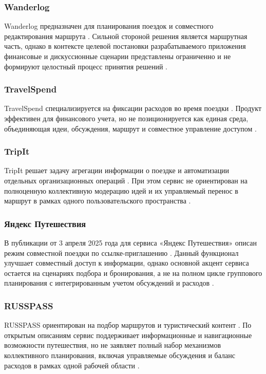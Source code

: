 \subsubsection{Wanderlog}
Wanderlog предназначен для планирования поездок и совместного редактирования маршрута . Сильной стороной решения является маршрутная часть, однако в контексте целевой постановки разрабатываемого приложения финансовые и дискуссионные сценарии представлены ограниченно и не формируют целостный процесс принятия решений .

\subsubsection{TravelSpend}
TravelSpend специализируется на фиксации расходов во время поездки . Продукт эффективен для финансового учета, но не позиционируется как единая среда, объединяющая идеи, обсуждения, маршрут и совместное управление доступом .

\subsubsection{TripIt}
TripIt решает задачу агрегации информации о поездке и автоматизации отдельных организационных операций . При этом сервис не ориентирован на полноценную коллективную модерацию идей и их управляемый перенос в маршрут в рамках одного пользовательского пространства .

\subsubsection{Яндекс Путешествия}
В публикации от 3 апреля 2025 года для сервиса «Яндекс Путешествия» описан режим совместной поездки по ссылке-приглашению . Данный функционал улучшает совместный доступ к информации, однако основной акцент сервиса остается на сценариях подбора и бронирования, а не на полном цикле группового планирования с интегрированным учетом обсуждений и расходов .

\subsubsection{RUSSPASS}
RUSSPASS ориентирован на подбор маршрутов и туристический контент . По открытым описаниям сервис поддерживает информационные и навигационные возможности путешествия, но не заявляет полный набор механизмов коллективного планирования, включая управляемые обсуждения и баланс расходов в рамках одной рабочей области .

